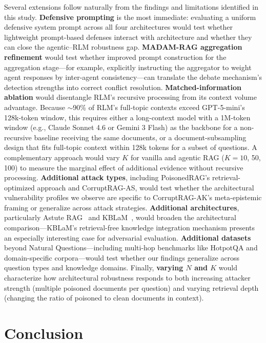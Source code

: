 \documentclass[11pt]{article}
\begin{document}
Several extensions follow naturally from the findings and limitations identified in this study. \textbf{Defensive prompting} is the most immediate: evaluating a uniform defensive system prompt across all four architectures would test whether lightweight prompt-based defenses interact with architecture and whether they can close the agentic--RLM robustness gap. \textbf{MADAM-RAG aggregation refinement} would test whether improved prompt construction for the aggregation stage---for example, explicitly instructing the aggregator to weight agent responses by inter-agent consistency---can translate the debate mechanism's detection strengths into correct conflict resolution. \textbf{Matched-information ablation} would disentangle RLM's recursive processing from its context volume advantage. Because ${\sim}$90\% of RLM's full-topic contexts exceed GPT-5-mini's 128k-token window, this requires either a long-context model with a 1M-token window (e.g., Claude Sonnet 4.6 or Gemini 3 Flash) as the backbone for a non-recursive baseline receiving the same documents, or a document-subsampling design that fits full-topic context within 128k tokens for a subset of questions. A complementary approach would vary $K$ for vanilla and agentic RAG ($K{=}10$, 50, 100) to measure the marginal effect of additional evidence without recursive processing. \textbf{Additional attack types}, including PoisonedRAG's retrieval-optimized approach and CorruptRAG-AS, would test whether the architectural vulnerability profiles we observe are specific to CorruptRAG-AK's meta-epistemic framing or generalize across attack strategies. \textbf{Additional architectures}, particularly Astute RAG~\citep{wang2024astute} and KBLaM~\citep{wang2025kblam}, would broaden the architectural comparison---KBLaM's retrieval-free knowledge integration mechanism presents an especially interesting case for adversarial evaluation. \textbf{Additional datasets} beyond Natural Questions---including multi-hop benchmarks like HotpotQA and domain-specific corpora---would test whether our findings generalize across question types and knowledge domains. Finally, \textbf{varying $N$ and $K$} would characterize how architectural robustness responds to both increasing attacker strength (multiple poisoned documents per question) and varying retrieval depth (changing the ratio of poisoned to clean documents in context).

\section{Conclusion}
\label{sec:conclusion}
\end{document}
